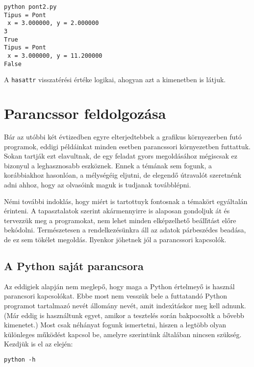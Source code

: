 \begin{Verbatim}[fontsize=\small]
python pont2.py
Tipus = Pont
 x = 3.000000, y = 2.000000
3
True
Tipus = Pont
 x = 3.000000, y = 11.200000
False
\end{Verbatim}

\noindent A {\tt hasattr} visszat\'er\'esi \'ert\'eke logikai, ahogyan azt a kimenetben is l\'atjuk.

\section{Parancssor feldolgoz\'asa}

B\'ar az ut\'obbi k\'et \'evtizedben egyre elterjedtebbek a grafikus k\"ornyezerben fut\'o 
programok, eddigi p\'eld\'ainkat minden esetben parancssori k\"ornyezetben futtattuk. Sokan 
tartj\'ak ezt elavultnak, de egy feladat gyors megold\'as\'ahoz m\'egiscsak ez bizonyul a 
leghasznosabb eszk\"oznek. Ennek a t\'em\'anak sem fogunk, a kor\'abbiakhoz hasonl\'oan, a 
m\'elys\'eg\'eig eljutni, de elegend\H{o} \'utraval\'ot szeretn\'enk adni ahhoz, hogy az 
olvas\'oink maguk is tudjanak tov\'abbl\'epni.

N\'emi tov\'abbi indokl\'as, hogy mi\'ert is tartottuyk fontosnak a t\'emak\"ort egy\'altal\'an 
\'erinteni. A tapasztalatok szerint ak\'armennyirre is alaposan gondoljuk \'at \'es tervezz\"uk 
meg a programokat, nem lehet minden elk\'epzelhet\H{o} be\'all\'{\i}t\'ast el\H{o}re bek\'odolni. 
Term\'eszetesen a rendelkez\'es\"unkra \'all az adatok p\'arbesz\'edes bead\'asa, de ez sem 
t\"ok\'elet megold\'as. Ilyenkor j\"ohetnek j\'ol a parancssori kapcsol\'ok.

\subsection{A Python saj\'at parancsora}

Az eddigiek alapj\'an nem meglep\H{o}, hogy maga a Python \'ertelmey\H{o} is haszn\'al 
parancsori kapcsol\'okat. Ebbe most nem vessz\"uk bele a futtatand\'o Python programot tartalmaz\'o 
nev\'et \'allom\'any nev\'et, amit index\'{\i}t\'askor meg kell adnunk. (M\'ar eddig is haszn\'altunk egyet, 
amikor a tesztel\'es sor\'an bakpocsoltk a b\H{o}vebb kimenetet.) Most csak n\'eh\'anyat fogunk ismertetni, 
hiszen a legt\"obb olyan k\"ul\"onleges m\H{u}k\"od\'est kapcsol be, amelyre szerint\"unk \'altal\'aban 
nincsen sz\"uks\'eg. Kezdj\"uk is el az elej\'en:

\begin{Verbatim}[fontsize=\small]
python -h
\end{Verbatim}

